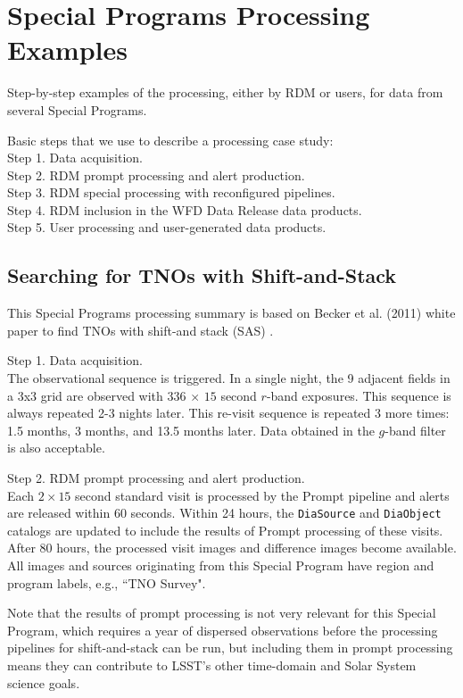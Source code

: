 \section{Special Programs Processing Examples}\label{sec:spcs}

Step-by-step examples of the processing, either by RDM or users, 
for data from several Special Programs. 

Basic steps that we use to describe a processing case study: \\
Step 1. Data acquisition. \\
Step 2. RDM prompt processing and alert production. \\
Step 3. RDM special processing with reconfigured pipelines. \\
Step 4. RDM inclusion in the WFD Data Release data products. \\
Step 5. User processing and user-generated data products. \\

\subsection{Searching for TNOs with Shift-and-Stack}\label{ssec:SPCS_TNO}

This Special Programs processing summary is based on Becker et al. (2011) 
white paper to find TNOs with shift-and stack (SAS) .

Step 1. Data acquisition. \\
The observational sequence is triggered. 
In a single night, the 9 adjacent fields in a 3x3 grid are observed with 
$336$ $\times$ $15$ second $r$-band exposures. 
This sequence is always repeated 2-3 nights later. 
This re-visit sequence is repeated 3 more times: 1.5 months, 3 months, and 13.5 months later. 
Data obtained in the $g$-band filter is also acceptable.

Step 2. RDM prompt processing and alert production. \\
Each $2\times15$ second standard visit is processed by the Prompt pipeline 
and alerts are released within 60 seconds.
Within 24 hours, the {\tt DiaSource} and {\tt DiaObject} catalogs are updated
to include the results of Prompt processing of these visits.
After 80 hours, the processed visit images and difference images become available.
All images and sources originating from this Special Program have 
region and program labels, e.g., ``TNO Survey".

Note that the results of prompt processing is not very relevant for this Special Program,
which requires a year of dispersed observations before the processing pipelines 
for shift-and-stack can be run, but including them in prompt processing means
they can contribute to LSST's other time-domain and Solar System science goals.

